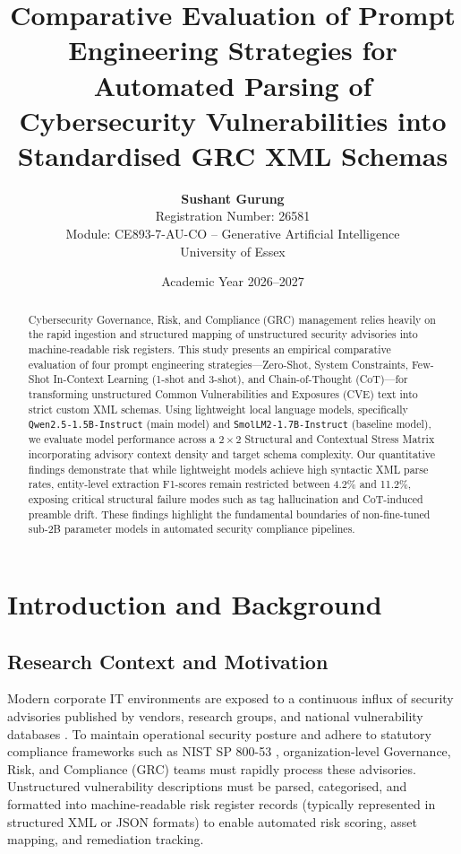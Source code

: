 \documentclass[11pt,a4paper]{article}
\title{\textbf{Comparative Evaluation of Prompt Engineering Strategies for Automated Parsing of Cybersecurity Vulnerabilities into Standardised GRC XML Schemas}}
\author{\textbf{Sushant Gurung} \\ Registration Number: 26581 \\ Module: CE893-7-AU-CO -- Generative Artificial Intelligence \\ University of Essex}
\date{Academic Year 2026--2027}
\begin{document}
\maketitle

\begin{abstract}
Cybersecurity Governance, Risk, and Compliance (GRC) management relies heavily on the rapid ingestion and structured mapping of unstructured security advisories into machine-readable risk registers. This study presents an empirical comparative evaluation of four prompt engineering strategies---Zero-Shot, System Constraints, Few-Shot In-Context Learning (1-shot and 3-shot), and Chain-of-Thought (CoT)---for transforming unstructured Common Vulnerabilities and Exposures (CVE) text into strict custom XML schemas. Using lightweight local language models, specifically \texttt{Qwen2.5-1.5B-Instruct} (main model) and \texttt{SmolLM2-1.7B-Instruct} (baseline model), we evaluate model performance across a $2 \times 2$ Structural and Contextual Stress Matrix incorporating advisory context density and target schema complexity. Our quantitative findings demonstrate that while lightweight models achieve high syntactic XML parse rates, entity-level extraction F1-scores remain restricted between 4.2\% and 11.2\%, exposing critical structural failure modes such as tag hallucination and CoT-induced preamble drift. These findings highlight the fundamental boundaries of non-fine-tuned sub-2B parameter models in automated security compliance pipelines.
\end{abstract}

\section{Introduction and Background}

\subsection{Research Context and Motivation}
Modern corporate IT environments are exposed to a continuous influx of security advisories published by vendors, research groups, and national vulnerability databases \cite{mitre2024cve}. To maintain operational security posture and adhere to statutory compliance frameworks such as NIST SP 800-53 \cite{nist80053}, organization-level Governance, Risk, and Compliance (GRC) teams must rapidly process these advisories. Unstructured vulnerability descriptions must be parsed, categorised, and formatted into machine-readable risk register records (typically represented in structured XML or JSON formats) to enable automated risk scoring, asset mapping, and remediation tracking.
\end{document}
